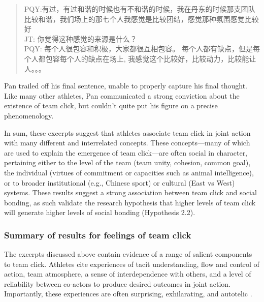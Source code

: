 \begin{CJK}{UTF8}{gbsn}
  \begin{quote}
    PQY:有过，有过和谐的时候也有不和谐的时候，我在丹东的时候那支团队比较和谐，我们场上的那七个人我感觉是比较团结，感觉那种氛围感觉比较好 \\
    JT: 你觉得这种感觉的来源是什么？\\
    PQY: 每个人很包容和积极，大家都很互相包容。 每个人都有缺点，但是每个人都包容每个人的缺点在场上, 我感觉这个比较好，比较动力，比较能让人。。。
  \end{quote}

Pan trailed off his final sentence, unable to properly capture his final thought.  Like many other athletes, Pan communicated a strong conviction about the existence of team click, but couldn't quite put his figure on a precise phenomenology.



In sum, these excerpts suggest that athletes associate team click in joint action with many different and interrelated concepts. These concepts---many of which are used to explain the emergence of team click---are often social in character, pertaining either to the level of the team (team unity, cohesion, common goal), the individual (virtues of commitment or capacities such as animal intelligence), or to broader institutional (e.g., Chinese sport) or cultural (East vs West) systems.  These results suggest a strong association between team click and social bonding, as such validate the research hypothesis that higher levels of team click will generate higher levels of social bonding (Hypothesis 2.2).



\subsubsection{Summary of results for feelings of team click}


The excerpts discussed above contain evidence of a range of salient components to team click.  Athletes cite experiences of tacit understanding, flow and control of action, team atmosphere, a sense of interdependence with others, and a level of reliability between co-actors to produce desired outcomes in joint action.  Importantly, these experiences are often surprising, exhilarating, and autotelic \citep{Csikszentmihalyi1990}.


\end{CJK}
